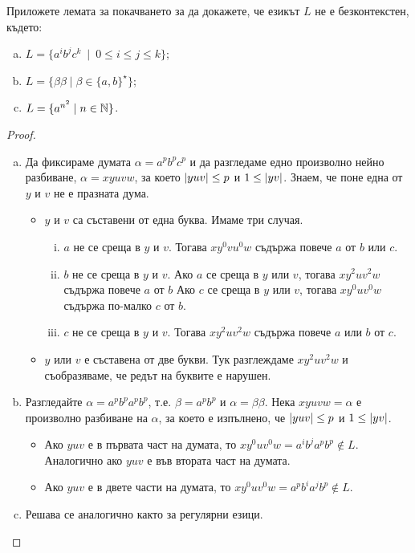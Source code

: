\begin{example}
  Приложете лемата за покачването за да докажете, че
  езикът $L$ не е безконтекстен, където:
  \begin{enumerate}[a)]
  \item
    $L = \{a^ib^jc^k\ \mid\ 0 \leq i \leq j \leq k\}$;
  \item
    $L = \{\beta\beta\mid \beta\in \{a,b\}^\star\}$;
  \item
    $L = \{a^{n^2}\mid n\in\mathbb{N}\}$.
  \end{enumerate}
\end{example}
\begin{proof}
  \begin{enumerate}[a)]
  \item
    Да фиксираме думата $\alpha = a^pb^pc^p$ и да разгледаме
    едно произволно нейно разбиване, $\alpha = xyuvw$, за което
    $\lvert{yuv}\rvert \leq p$ и $1 \leq \lvert{yv}\rvert$.
    Знаем, че поне една от $y$ и $v$ не е празната дума.
    \begin{itemize}
    \item
      $y$ и $v$ са съставени от една буква.
      Имаме три случая.
      \begin{enumerate}[i)]
      \item
        $a$ не се среща в $y$ и $v$.
        Тогава $xy^0vu^0w$ съдържа повече $a$ от $b$ или $c$.
      \item
        $b$ не се среща в $y$ и $v$.
        Ако $a$ се среща в $y$ или $v$, тогава $xy^2uv^2w$ съдържа повече $a$ от $b$
        Ако $c$ се среща в $y$ или $v$, тогава $xy^0uv^0w$ съдържа по-малко $c$ от $b$.
      \item
        $c$ не се среща в $y$ и $v$.
        Тогава $xy^2uv^2w$ съдържа повече $a$ или $b$ от $c$.
      \end{enumerate}      
    \item
      $y$ или $v$ е съставена от две букви.
      Тук разглеждаме $xy^2uv^2w$ и съобразяваме, че редът на буквите е нарушен.
    \end{itemize}
  \item
    Разгледайте $\alpha = a^pb^pa^pb^p$, т.е. $\beta = a^pb^p$ и $\alpha = \beta\beta$.
    Нека $xyuvw = \alpha$ е произволно разбиване на $\alpha$, за което е изпълнено, че
    $\lvert{yuv}\rvert \leq p$ и $1\leq \lvert{yv}\rvert$.
    \begin{itemize}
    \item
      Ако $yuv$ е в първата част на думата, то 
      $xy^0uv^0w = a^ib^ja^pb^p \not\in L$.
      Аналогично ако $yuv$ е във втората част на думата.
    \item
      Ако $yuv$ е в двете части на думата, то 
      $xy^0uv^0w = a^pb^ia^jb^p \not\in L$.
    \end{itemize}    
  \item
    Решава се аналогично както за регулярни езици.
  \end{enumerate}
\end{proof}


